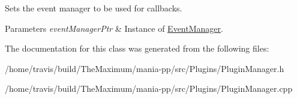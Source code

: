 Sets the event manager to be used for callbacks. 


\begin{DoxyParams}{Parameters}
{\em event\-Manager\-Ptr} & Instance of \hyperlink{classEventManager}{Event\-Manager}. \\
\hline
\end{DoxyParams}


The documentation for this class was generated from the following files\-:\begin{DoxyCompactItemize}
\item 
/home/travis/build/\-The\-Maximum/mania-\/pp/src/\-Plugins/Plugin\-Manager.\-h\item 
/home/travis/build/\-The\-Maximum/mania-\/pp/src/\-Plugins/Plugin\-Manager.\-cpp\end{DoxyCompactItemize}
